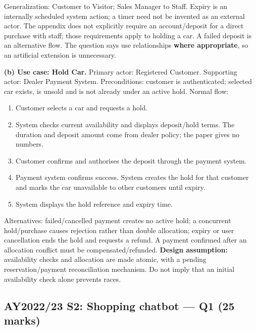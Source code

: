 \begin{studycolumns}
\vspace{0pt}




Generalization: Customer to Visitor; Sales Manager to Staff. Expiry is an internally scheduled system action; a timer need not be invented as an external actor. The appendix does not explicitly require an account/\allowbreak{}deposit for a direct purchase with staff; those requirements apply to holding a car. A failed deposit is an alternative flow. The question says use relationships \textbf{where appropriate}, so an artificial extension is unnecessary.

\textbf{(b) Use case: Hold Car.} Primary actor: Registered Customer. Supporting actor: Dealer Payment System. Preconditions: customer is authenticated; selected car exists, is unsold and is not already under an active hold. Normal flow:

\begin{enumerate}
\item Customer selects a car and requests a hold.
\item System checks current availability and displays deposit/\allowbreak{}hold terms. The duration and deposit amount come from dealer policy; the paper gives no numbers.
\item Customer confirms and authorises the deposit through the payment system.
\item Payment system confirms success. System creates the hold for that customer and marks the car unavailable to other customers until expiry.
\item System displays the hold reference and expiry time.
\end{enumerate}
Alternatives: failed/\allowbreak{}cancelled payment creates no active hold; a concurrent hold/\allowbreak{}purchase causes rejection rather than double allocation; expiry or user cancellation ends the hold and requests a refund. A payment confirmed after an allocation conflict must be compensated/\allowbreak{}refunded. \textbf{Design assumption:} availability checks and allocation are made atomic, with a pending reservation/\allowbreak{}payment reconciliation mechanism. Do not imply that an initial availability check alone prevents races.
\end{studycolumns}

\par\Needspace{85pt}\subsection*{AY2022/23 S2: Shopping chatbot --- Q1 (25 marks)}\label{old-2223-s2-q1}


